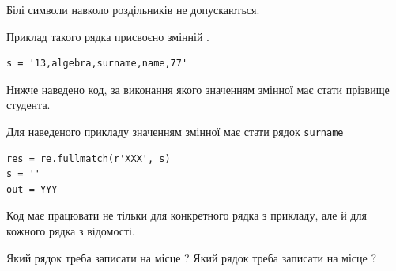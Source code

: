 \documentclass[12pt, ukrainian]{article}
\def\code#1{\Verb!#1!}
\begin{document}
{Білі символи навколо роздільників не допускаються.

Приклад такого рядка присвоєно змінній .



\begin{verbatim}
s = '13,algebra,surname,name,77'
\end{verbatim}


Нижче наведено код, за виконання якого значенням змінної  має стати прізвище студента.

Для наведеного прикладу значенням змінної  має стати рядок \code{surname}



\begin{verbatim}
res = re.fullmatch(r'XXX', s)
s = ''
out = YYY
\end{verbatim}


Код має працювати не тільки для конкретного рядка з прикладу, але й для кожного рядка з відомості.


Який рядок треба записати на місце  ?
Який рядок треба записати на місце  ?\par

}
\end{document}
